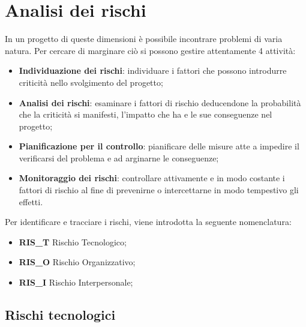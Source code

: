 \section{Analisi dei rischi}

In un progetto di queste dimensioni è possibile incontrare problemi di varia natura. Per cercare di marginare ciò si possono gestire attentamente 4 attività:

\begin{itemize}
	\item \textbf{Individuazione dei rischi}: individuare i fattori che possono introdurre criticità nello svolgimento del progetto;
	\item \textbf{Analisi dei rischi}: esaminare i fattori di rischio deducendone la probabilità che la criticità si manifesti, l'impatto che ha e le sue conseguenze nel progetto;
	\item \textbf{Pianificazione per il controllo}: pianificare delle misure atte a impedire il verificarsi del problema e ad arginarne le conseguenze;
	\item \textbf{Monitoraggio dei rischi}: controllare attivamente e in modo costante i fattori di rischio al fine di prevenirne o intercettarne in modo tempestivo gli effetti.
\end{itemize}


Per identificare e tracciare i rischi, viene introdotta la seguente nomenclatura:

\begin{itemize}
	\item \textbf{RIS\_T} Rischio Tecnologico;
	\item \textbf{RIS\_O} Rischio Organizzativo;
	\item \textbf{RIS\_I} Rischio Interpersonale;
\end{itemize}

\subsection{Rischi tecnologici}




